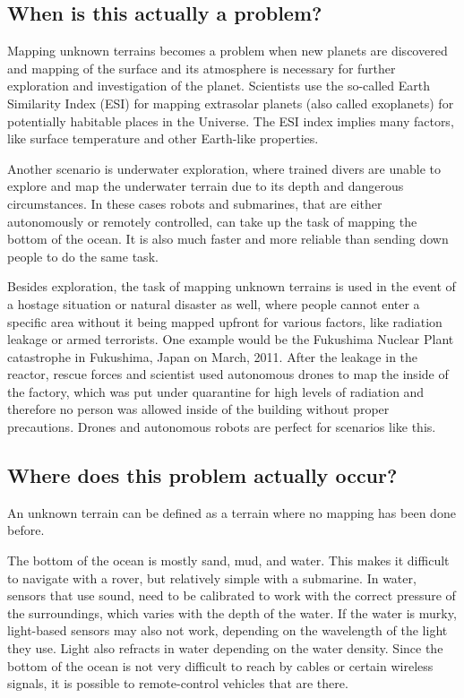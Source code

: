 \subsection{When is this actually a problem?}
Mapping unknown terrains becomes a problem when new planets are discovered and mapping of the surface and its atmosphere is necessary for further exploration and investigation of the planet. Scientists use the so-called Earth Similarity Index (ESI) for mapping extrasolar planets (also called exoplanets) for potentially habitable places in the Universe\cite{exoplanets}\cite{esi}. The ESI index implies many factors, like surface temperature and other Earth-like properties. 

Another scenario is underwater exploration, where trained divers are unable to explore and map the underwater terrain due to its depth and dangerous circumstances. In these cases robots and submarines, that are either autonomously or remotely controlled, can take up the task of mapping the bottom of the ocean. It is also much faster and more reliable than sending down people to do the same task.

Besides exploration, the task of mapping unknown terrains is used in the event of a hostage situation or natural disaster as well, where people cannot enter a specific area without it being mapped upfront for various factors, like radiation leakage or armed terrorists. One example would be the Fukushima Nuclear Plant catastrophe in Fukushima, Japan on March, 2011. After the leakage in the reactor, rescue forces and scientist used autonomous drones to map the inside of the factory\cite{fukushima}, which was put under quarantine for high levels of radiation and therefore no person was allowed inside of the building without proper precautions. Drones and autonomous robots are perfect for scenarios like this.

\clearpage

\subsection{Where does this problem actually occur?}
An unknown terrain can be defined as a terrain where no mapping has been done before.

The bottom of the ocean is mostly sand, mud, and water\cite{bottom-composition}. This makes it difficult to navigate with a rover, but relatively simple with a submarine. In water, sensors that use sound, need to be calibrated to work with the correct pressure of the surroundings, which varies with the depth of the water. If the water is murky, light-based sensors may also not work, depending on the wavelength of the light they use. Light also refracts in water depending on the water density. Since the bottom of the ocean is not very difficult to reach by cables or certain wireless signals, it is possible to remote-control vehicles that are there.

